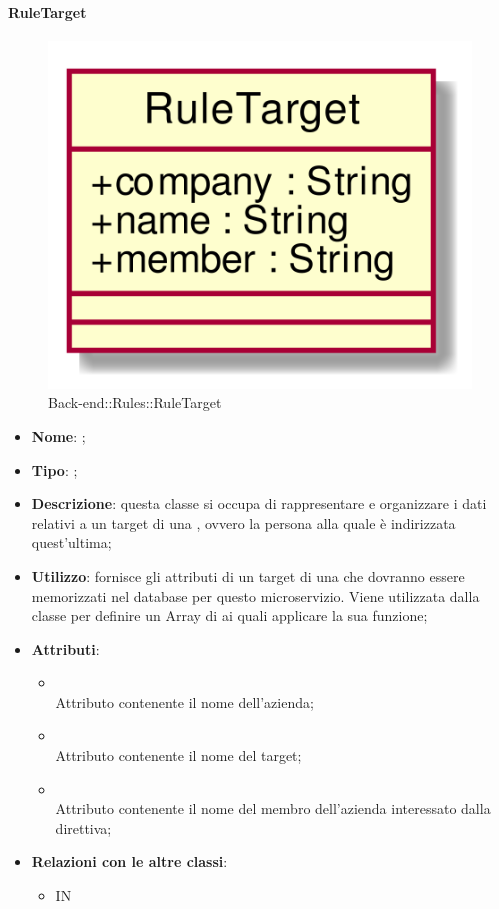 \hypertarget{RuleTarget_label}{\paragraph{RuleTarget}}
\begin{figure}[h]
	\centering
	\includegraphics[width=\textwidth,height=\textheight,keepaspectratio]{images/ClassRuleTarget.png}
	\caption{Back-end::Rules::RuleTarget}
\end{figure}
\begin{itemize}
	\item \textbf{Nome}: ;
	\item \textbf{Tipo}: ;
	\item \textbf{Descrizione}: questa classe si occupa di rappresentare e organizzare i dati relativi a un target di una , ovvero la persona alla quale è indirizzata quest'ultima;
	\item \textbf{Utilizzo}: fornisce gli attributi di un target di una  che dovranno essere memorizzati nel database per questo microservizio.
Viene utilizzata dalla classe  per definire un Array di  ai quali applicare la sua funzione;
	\item \textbf{Attributi}:
	\begin{itemize}
		\item[]  \\
		Attributo contenente il nome dell'azienda;
		\item[]  \\
		Attributo contenente il nome del target;
		\item[]  \\
		Attributo contenente il nome del membro dell'azienda interessato dalla direttiva;
	\end{itemize}
	\item \textbf{Relazioni con le altre classi}:
	\begin{itemize}
		\item IN \hyperlink{Rule_label}{}
	\end{itemize}
\end{itemize}
\FloatBarrier

